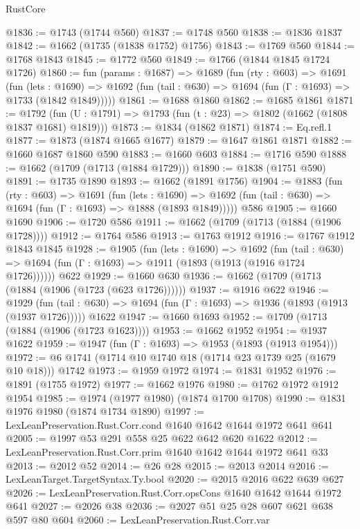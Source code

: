 \begin{lexlean}{RustCore}
\begin{coremodule}
@1836 := @1743 (@1744 @560)
@1837 := @1748 @560
@1838 := @1836 @1837
@1842 := @1662 (@1735 (@1838 @1752) @1756)
@1843 := @1769 @560
@1844 := @1768 @1843
@1845 := @1772 @560
@1849 := @1766 (@1844 @1845 @1724 @1726)
@1860 := fun (params : @1687) =>
  @1689
    (fun (rty : @603) =>
    @1691
      (fun (lets : @1690) =>
      @1692 (fun (tail : @630) => @1694 (fun (Γ : @1693) => @1733 (@1842 @1849)))))
@1861 := @1688 @1860
@1862 := @1685 @1861
@1871 := @1792 (fun (U : @1791) => @1793 (fun (t : @23) => @1802 (@1662 (@1808 @1837 @1681) @1819)))
@1873 := @1834 (@1862 @1871)
@1874 := Eq.refl.{1}
@1877 := @1873 (@1874 @1665 @1677)
@1879 := @1647 @1861 @1871
@1882 := @1660 @1687 @1860 @590
@1883 := @1660 @603
@1884 := @1716 @590
@1888 := @1662 (@1709 (@1713 (@1884 @1729)))
@1890 := @1838 (@1751 @590)
@1891 := @1735 @1890
@1893 := @1662 (@1891 @1756)
@1904 := @1883
    (fun (rty : @603) =>
    @1691
      (fun (lets : @1690) =>
      @1692 (fun (tail : @630) => @1694 (fun (Γ : @1693) => @1888 (@1893 @1849)))))
    @586
@1905 := @1660 @1690
@1906 := @1720 @586
@1911 := @1662 (@1709 (@1713 (@1884 (@1906 @1728))))
@1912 := @1764 @586
@1913 := @1763 @1912
@1916 := @1767 @1912 @1843 @1845
@1928 := @1905
    (fun (lets : @1690) =>
    @1692
      (fun (tail : @630) => @1694 (fun (Γ : @1693) => @1911 (@1893 (@1913 (@1916 @1724 @1726))))))
    @622
@1929 := @1660 @630
@1936 := @1662 (@1709 (@1713 (@1884 (@1906 (@1723 (@623 @1726))))))
@1937 := @1916 @622
@1946 := @1929
    (fun (tail : @630) => @1694 (fun (Γ : @1693) => @1936 (@1893 (@1913 (@1937 @1726)))))
    @1622
@1947 := @1660 @1693
@1952 := @1709 (@1713 (@1884 (@1906 (@1723 @1623))))
@1953 := @1662 @1952
@1954 := @1937 @1622
@1959 := @1947 (fun (Γ : @1693) => @1953 (@1893 (@1913 @1954)))
@1972 := @6 @1741 (@1714 @10 @1740 @18 (@1714 @23 @1739 @25 (@1679 @10 @18))) @1742
@1973 := @1959 @1972
@1974 := @1831 @1952
@1976 := @1891 (@1755 @1972)
@1977 := @1662 @1976
@1980 := @1762 @1972 @1912 @1954
@1985 := @1974 (@1977 @1980) (@1874 @1700 @1708)
@1990 := @1831 @1976 @1980 (@1874 @1734 @1890)
@1997 := LexLeanPreservation.Rust.Corr.cond @1640 @1642 @1644 @1972 @641 @641
@2005 := @1997 @53 @291 @558 @25 @622 @642 @620 @1622
@2012 := LexLeanPreservation.Rust.Corr.prim @1640 @1642 @1644 @1972 @641 @33
@2013 := @2012 @52
@2014 := @26 @28
@2015 := @2013 @2014
@2016 := LexLeanTarget.TargetSyntax.Ty.bool
@2020 := @2015 @2016 @622 @639 @627
@2026 := LexLeanPreservation.Rust.Corr.opsCons @1640 @1642 @1644 @1972 @641
@2027 := @2026 @38
@2036 := @2027 @51 @25 @28 @607 @621 @638 @597 @80 @604
@2060 := LexLeanPreservation.Rust.Corr.var

\end{coremodule}
\end{lexlean}
